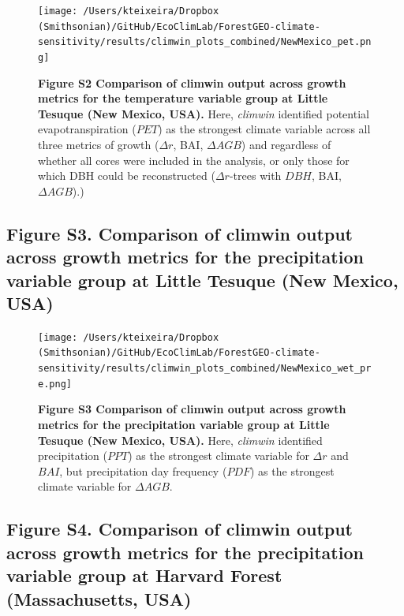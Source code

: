 \documentclass[
]{article}
\begin{document}
\begin{figure}
\centering
\texttt{[image: /Users/kteixeira/Dropbox (Smithsonian)/GitHub/EcoClimLab/ForestGEO-climate-sensitivity/results/climwin\_plots\_combined/NewMexico\_pet.png]}
\caption{\textbf{Figure S2 \textbar{} Comparison of climwin output
across growth metrics for the temperature variable group at Little
Tesuque (New Mexico, USA).} Here, \emph{climwin} identified potential
evapotranspiration (\(PET\)) as the strongest climate variable across
all three metrics of growth (\(\Delta r\), BAI, \(\Delta AGB\)) and
regardless of whether all cores were included in the analysis, or only
those for which DBH could be reconstructed (\(\Delta r\)-trees with
\(DBH\), BAI, \(\Delta AGB\)).)}
\end{figure}

\newpage

\hypertarget{figure-s3.-comparison-of-climwin-output-across-growth-metrics-for-the-precipitation-variable-group-at-little-tesuque-new-mexico-usa}{%
\subsection{Figure S3. Comparison of climwin output across growth
metrics for the precipitation variable group at Little Tesuque (New
Mexico,
USA)}\label{figure-s3.-comparison-of-climwin-output-across-growth-metrics-for-the-precipitation-variable-group-at-little-tesuque-new-mexico-usa}}

\begin{figure}
\centering
\texttt{[image: /Users/kteixeira/Dropbox (Smithsonian)/GitHub/EcoClimLab/ForestGEO-climate-sensitivity/results/climwin\_plots\_combined/NewMexico\_wet\_pre.png]}
\caption{\textbf{Figure S3 \textbar{} Comparison of climwin output
across growth metrics for the precipitation variable group at Little
Tesuque (New Mexico, USA).} Here, \emph{climwin} identified
precipitation (\(PPT\)) as the strongest climate variable for
\(\Delta r\) and \(BAI\), but precipitation day frequency (\(PDF\)) as
the strongest climate variable for \(\Delta AGB\).}
\end{figure}

\newpage

\hypertarget{figure-s4.-comparison-of-climwin-output-across-growth-metrics-for-the-precipitation-variable-group-at-harvard-forest-massachusetts-usa}{%
\subsection{Figure S4. Comparison of climwin output across growth
metrics for the precipitation variable group at Harvard Forest
(Massachusetts,
USA)}\label{figure-s4.-comparison-of-climwin-output-across-growth-metrics-for-the-precipitation-variable-group-at-harvard-forest-massachusetts-usa}}
\end{document}
